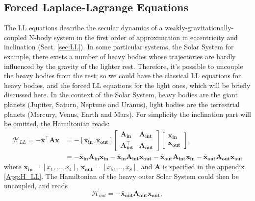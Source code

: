 \documentclass[12pt]{article}
\begin{document}
	\subsection{Forced Laplace-Lagrange Equations} \label{sec:FLL}
	The LL equations describe the secular dynamics of a weakly-gravitationally-coupled N-body system in the first order of approximation in eccentricity and inclination (Sect. \ref{sec:LL}). In some particular systems, the Solar System for example, there exists a  number of heavy bodies whose trajectories are hardly influenced by the gravity of the lighter rest. Therefore, it's possible to uncouple the heavy bodies from the rest; so we could have the classical LL equations for heavy bodies, and the forced LL equations for the light ones, which will be briefly discussed here. In the context of the Solar System, heavy bodies are the giant planets (Jupiter, Saturn, Neptune and Uranus), light bodies are the terrestrial planets (Mercury, Venus, Earth and Mars).
	For simplicity the inclination part will be omitted, the Hamiltonian reads: 
	\begin{equation}
	\begin{aligned}
	\mathcal{H}_{LL} = - \boldsymbol{\bar{x}}^\top \mathbf{A} \boldsymbol{x} 
	&= -[ \boldsymbol{\bar{x}_{in}}, \boldsymbol{\bar{x}_{out}} ] 
	\begin{bmatrix}
	\mathbf{A_{in}}  & \mathbf{A_{int}}  \\
	\mathbf{A^{\top}_{int}}  & \mathbf{A_{out}} 
	\end{bmatrix}
	\begin{bmatrix}
	\boldsymbol{x_{in}} \\ \boldsymbol{x_{out}}
	\end{bmatrix}, \\
	&=  - \boldsymbol{\bar{x}_{in}} \mathbf{A_{in}} \boldsymbol{x_{in}} - \boldsymbol{\bar{x}_{in}} \mathbf{A_{int}} \boldsymbol{x_{out}}  - \boldsymbol{\bar{x}_{out}} \mathbf{A_{int}} \boldsymbol{x_{in}} - \boldsymbol{\bar{x}_{out}} \mathbf{A_{out}} \boldsymbol{x_{out}} 
	\end{aligned}
	\end{equation}
	where $\boldsymbol{x_{in}} = [x_1,\dots,x_4]$, $\boldsymbol{x_{out}} = [x_5,\dots,x_8]$, and  $\mathbf{A}$ is specified in the appendix \ref{App:H_LL}. The Hamiltonian of the heavy outer Solar System could then be uncoupled, and reads
	\begin{equation}
	\mathcal{H}_{out} = - \boldsymbol{\bar{x}_{out}} \mathbf{A_{out}} \boldsymbol{x_{out}},
	\end{equation}
\end{document}
